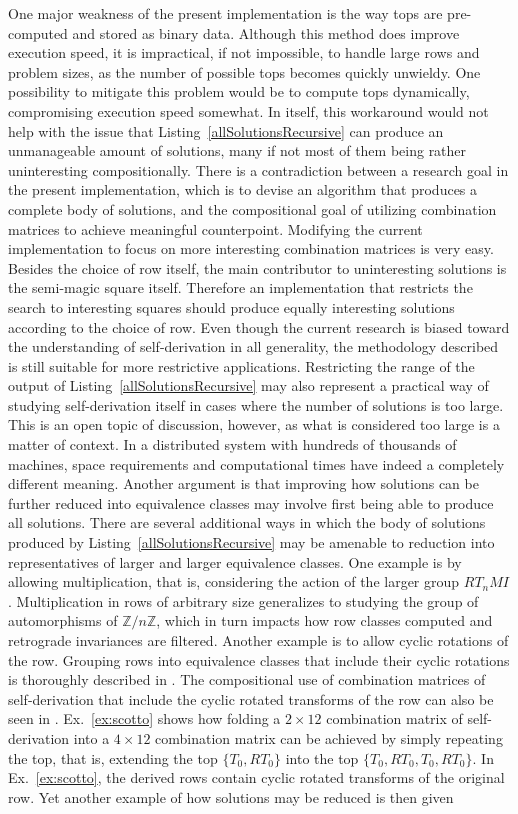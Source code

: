 One major weakness of the present implementation is the way tops are pre-computed and stored as binary data. Although this method does improve execution speed, it is impractical, if not impossible, to handle large rows and problem sizes, as the number of possible tops becomes quickly unwieldy. One possibility to mitigate this problem would be to compute tops dynamically, compromising execution speed somewhat. In itself, this workaround would not help with the issue that Listing~\ref{allSolutionsRecursive} can produce an unmanageable amount of solutions, many if not most of them being rather uninteresting compositionally. There is a contradiction between a research goal in the present implementation, which is to devise an algorithm that produces a complete body of solutions, and the compositional goal of utilizing combination matrices to achieve meaningful counterpoint. Modifying the current implementation to focus on more interesting combination matrices is very easy. Besides the choice of row itself, the main contributor to uninteresting solutions is the semi-magic square itself. Therefore an implementation that restricts the search to interesting squares should produce equally interesting solutions according to the choice of row. Even though the current research is biased toward the understanding of self-derivation in all generality, the methodology described is still suitable for more restrictive applications. Restricting the range of the output of Listing~\ref{allSolutionsRecursive} may also represent a practical way of studying self-derivation itself in cases where the number of solutions is too large. This is an open topic of discussion, however, as what is considered too large is a matter of context. In a distributed system with hundreds of thousands of machines, space requirements and computational times have indeed a completely different meaning. Another argument is that improving how solutions can be further reduced into equivalence classes may involve first being able to produce all solutions. There are several additional ways in which the body of solutions produced by Listing~\ref{allSolutionsRecursive} may be amenable to reduction into representatives of larger and larger equivalence classes. One example is by allowing multiplication, that is, considering the action of the larger group $RT_nMI$. Multiplication in rows of arbitrary size generalizes to studying the group of automorphisms of $\mathbb{Z} / n \mathbb{Z}$, which in turn impacts how row classes computed and retrograde invariances are filtered. Another example is to allow cyclic rotations of the row. Grouping rows into equivalence classes that include their cyclic rotations is thoroughly described in \cite{FripertingerLackner2015}. The compositional use of combination matrices of self-derivation that include the cyclic rotated transforms of the row can also be seen in \cite{Scotto2000}. Ex.~\ref{ex:scotto} shows how folding a $2 \times 12$ combination matrix of self-derivation into a $4 \times 12$ combination matrix can be achieved by simply repeating the top, that is, extending the top $\{T_0, RT_0\}$ into the top $\{T_0, RT_0, T_0, RT_0\}$. In Ex.~\ref{ex:scotto}, the derived rows contain cyclic rotated transforms of the original row. Yet another example of how solutions may be reduced is then given 